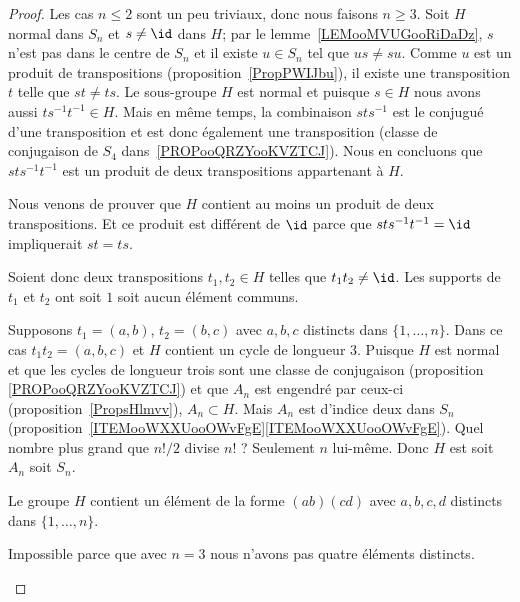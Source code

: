 \begin{proof}
	Les cas \( n\leq 2\) sont un peu triviaux, donc nous faisons \( n\geq 3\). Soit \( H\) normal dans \( S_n\) et \( s\neq \id\) dans \( H\); par le lemme~\ref{LEMooMVUGooRiDaDz}, \( s\) n'est pas dans le centre de \( S_n\) et il existe \( u\in S_n\) tel que \( us\neq su\). Comme \( u\) est un produit de transpositions (proposition~\ref{PropPWIJbu}), il existe une transposition \( t\) telle que \( st\neq ts\). Le sous-groupe \( H\) est normal et puisque \( s\in H\) nous avons aussi \( ts^{-1}t^{-1}\in H\). Mais en même temps, la combinaison \( sts^{-1}\) est le conjugué d'une transposition et est donc également une transposition (classe de conjugaison de \( S_4\) dans~\ref{PROPooQRZYooKVZTCJ}). Nous en concluons que \( sts^{-1}t^{-1}\) est un produit de deux transpositions appartenant à \( H\).

	Nous venons de prouver que \( H\) contient au moins un produit de deux transpositions. Et ce produit est différent de \( \id\) parce que \( sts^{-1}t^{-1}=\id\) impliquerait \( st=ts\).

	Soient donc deux transpositions \( t_1,t_2\in H\) telles que \( t_1t_2\neq \id\). Les supports de \( t_1\) et \( t_2\) ont soit \( 1\) soit aucun élément communs.

	\begin{subproof}

		Supposons \( t_1=(a,b)\), \( t_2=(b,c)\) avec \( a,b,c\) distincts dans \( \{ 1,\ldots, n \}\). Dans ce cas \( t_1t_2=(a,b,c)\) et \( H\) contient un cycle de longueur \( 3\). Puisque \( H\) est normal et que les cycles de longueur trois sont une classe de conjugaison (proposition \ref{PROPooQRZYooKVZTCJ}) et que \( A_n\) est engendré par ceux-ci (proposition~\ref{PropsHlmvv}), \( A_n\subset H\). Mais \( A_n\) est d'indice deux dans \( S_n\) (proposition~\ref{ITEMooWXXUooOWvFgE}\ref{ITEMooWXXUooOWvFgE}). Quel nombre plus grand que \( n!/2\) divise \( n!\) ? Seulement \( n\) lui-même. Donc \( H\) est soit \( A_n\) soit \( S_n\).


		Le groupe \( H\) contient un élément de la forme \( (ab)(cd)\) avec \( a,b,c,d\) distincts dans \( \{ 1,\ldots, n \}\).

		\begin{subproof}

			\spitem[Si \( n=3\)]

			Impossible parce que avec \( n=3\) nous n'avons pas quatre éléments distincts.


\end{subproof}
\end{subproof}
\end{proof}
